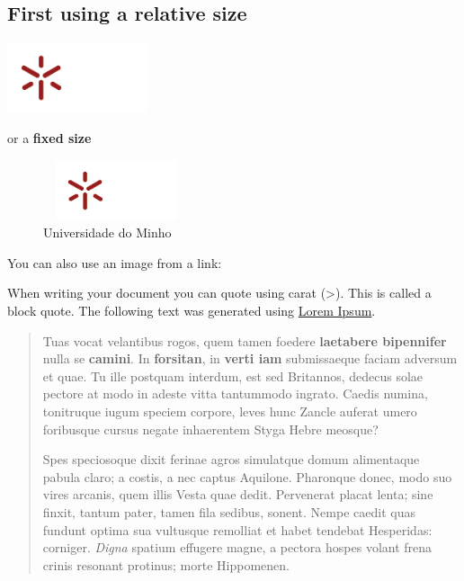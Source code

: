 \documentclass[
]{article}
\begin{document}
\hypertarget{first-using-a-relative-size}{%
\subsection{First using a relative size}\label{first-using-a-relative-size}}

\includegraphics[width=0.31\textwidth,height=\textheight]{./images/uminho.png}

or a \textbf{fixed size}

\begin{figure}
\centering
\includegraphics[width=1.7in,height=0.7in]{./images/uminho.png}
\caption{Universidade do Minho}
\end{figure}

You can also use an image from a link:

When writing your document you can quote using carat (\textgreater). This is called a block quote. The following text was generated using \href{https://jaspervdj.be/lorem-markdownum/}{Lorem Ipsum}.

\begin{quote}
Tuas vocat velantibus rogos, quem tamen foedere \textbf{laetabere bipennifer} nulla
se \textbf{camini}. In \textbf{forsitan}, in \textbf{verti iam} submissaeque faciam adversum et
quae. Tu ille postquam interdum, est sed Britannos, dedecus solae pectore at
modo in adeste vitta tantummodo ingrato. Caedis numina, tonitruque iugum speciem
corpore, leves hunc Zancle auferat umero foribusque cursus negate inhaerentem
Styga Hebre meosque?

Spes speciosoque dixit ferinae agros simulatque domum alimentaque pabula claro;
a costis, a nec captus Aquilone. Pharonque donec, modo suo vires arcanis, quem
illis Vesta quae dedit. Pervenerat placat lenta; sine finxit, tantum pater,
tamen fila sedibus, sonent. Nempe caedit quas fundunt optima sua vultusque
remolliat et habet tendebat Hesperidas: corniger. \emph{Digna} spatium effugere
magne, a pectora hospes volant frena crinis resonant protinus; morte Hippomenen.
\end{quote}
\end{document}
